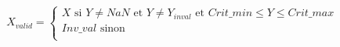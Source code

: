 \[
X_{valid} = 
\begin{cases}
X \text{ si } Y \ne NaN \text{ et } Y \ne Y_{inval} \text{ et } Crit\_min \le Y \le Crit\_max \\
Inv\_val \text{ sinon}\\
\end{cases}
\]

